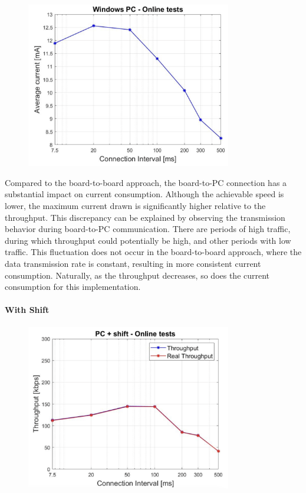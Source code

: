 \documentclass{Configuration_Files/PoliMi3i_thesis}
\begin{document}
\begin{figure}[H]
    \centering
    \includegraphics[width=0.8\textwidth]{Results Manuel/figure36}
    \label{fig:figure1}
\end{figure}

Compared to the board-to-board approach, the board-to-PC connection has a substantial impact on current consumption. Although the achievable speed is lower, the maximum current drawn is significantly higher relative to the throughput. This discrepancy can be explained by observing the transmission behavior during board-to-PC communication. There are periods of high traffic, during which throughput could potentially be high, and other periods with low traffic. This fluctuation does not occur in the board-to-board approach, where the data transmission rate is constant, resulting in more consistent current consumption. Naturally, as the throughput decreases, so does the current consumption for this implementation.

\paragraph{With Shift}

\begin{figure}[H]
    \centering
    \includegraphics[width=0.8\textwidth]{Results Manuel/figure37}
    \label{fig:figure1}
\end{figure}
\end{document}
